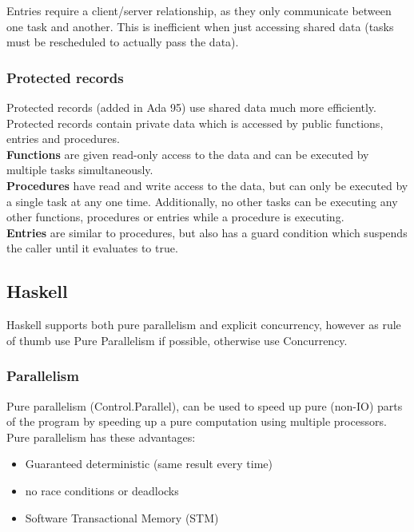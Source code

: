 \documentclass[a4paper,oneside]{report}
\begin{document}
      		Entries require a client/server relationship, as they only communicate between one task and another. This is inefficient when just accessing shared data (tasks must be rescheduled to actually pass the data).
      		
      		\subsubsection{Protected records}
      		Protected records (added in Ada 95) use shared data much more efficiently. Protected records contain private data which is accessed by public functions, entries and procedures.\\
      		
      		\noindent\textbf{Functions} are given read-only access to the data and can be executed by multiple tasks simultaneously.\\
      		
      		\noindent\textbf{Procedures} have read and write access to the data, but can only be executed by a single task at any one time. Additionally, no other tasks can be executing any other functions, procedures or entries while a procedure is executing.\\
      		
      		\noindent\textbf{Entries} are similar to procedures, but also has a guard condition which suspends the caller until it evaluates to true. 
      		
    	\subsection{Haskell}

		Haskell supports both pure parallelism and explicit concurrency, however as rule of thumb use Pure Parallelism if possible, otherwise use Concurrency.

		\subsubsection{Parallelism}

			Pure parallelism (Control.Parallel), can be used to speed up pure (non-IO) parts of the program by speeding up a pure computation using multiple processors. Pure parallelism has these advantages:
				\begin{itemize}
					\item Guaranteed deterministic (same result every time)
					\item no race conditions or deadlocks
					\item Software Transactional Memory (STM)
				\end{itemize}
\end{document}
